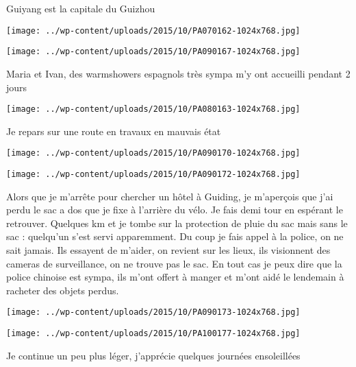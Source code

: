  \newline
 Guiyang est la capitale du Guizhou \newline
 \newline
\centerline{\texttt{[image: ../wp-content/uploads/2015/10/PA070162-1024x768.jpg]} } 
 \newline
 \newline
\centerline{\texttt{[image: ../wp-content/uploads/2015/10/PA090167-1024x768.jpg]} } 
 \newline
 Maria et Ivan, des warmshowers espagnols très sympa m'y ont accueilli pendant 2 jours \newline
 \newline
\centerline{\texttt{[image: ../wp-content/uploads/2015/10/PA080163-1024x768.jpg]} } 
 \newline
 Je repars sur une route en travaux en mauvais état \newline
 \newline
\centerline{\texttt{[image: ../wp-content/uploads/2015/10/PA090170-1024x768.jpg]} } 
 \newline
 \newline
\centerline{\texttt{[image: ../wp-content/uploads/2015/10/PA090172-1024x768.jpg]} } 
 \newline
 Alors que je m'arrête pour chercher un hôtel à Guiding, je m'aperçois que j'ai perdu le sac a dos que je fixe à l'arrière du vélo. Je fais demi tour en espérant le retrouver. Quelques km et je tombe sur la protection de pluie du sac mais sans le sac : quelqu'un s'est servi apparemment. \newline
 Du coup je fais appel à la police, on ne sait jamais. Ils essayent de m'aider, on revient sur les lieux, ils visionnent des cameras de surveillance, on ne trouve pas le sac. En tout cas je peux dire que la police chinoise est sympa, ils m'ont offert à manger et m'ont aidé le lendemain à racheter des objets perdus. \newline
 \newline
\centerline{\texttt{[image: ../wp-content/uploads/2015/10/PA090173-1024x768.jpg]} } 
 \newline
 \newline
\centerline{\texttt{[image: ../wp-content/uploads/2015/10/PA100177-1024x768.jpg]} } 
 \newline
 Je continue un peu plus léger, j'apprécie quelques journées ensoleillées \newline
